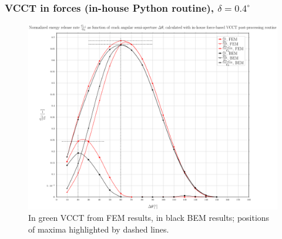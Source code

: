 \documentclass[first,firstsupp,lastsupp,handout,last,hyperref,table]{ETHclass}
\begin{document}
\begin{frame}
\frametitle{\small VCCT in forces (in-house Python routine), $\delta=0.4^{\circ}$}
\vspace{-0.5cm}
\centering
\captionsetup[figure]{font=scriptsize,labelfont=scriptsize}
\begin{figure}[!h]
\centering
\includegraphics[height=0.7\textheight]{2017-07-10_AbqRunSummary_SmallStrainD04_M-F-VCCT_Summary.pdf}
  \caption{\scriptsize In green VCCT from FEM results, in black BEM results; positions of maxima highlighted by dashed lines.}
  \label{fig:res1}
\end{figure}
\end{frame}
\end{document}
